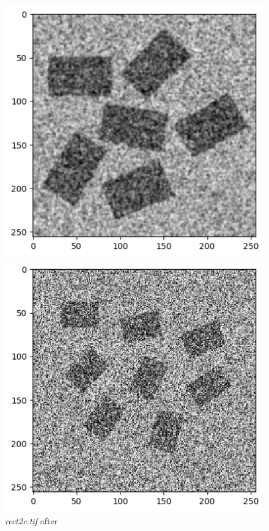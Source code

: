 \documentclass[runningheads]{llncs}
\begin{document}
\begin{figure}[h!]
\begin{minipage}[h]{0.47\linewidth}
\begin{center}
\includegraphics[width=1\linewidth]{Report/Result_Images/image_hc2.png} 
\caption{\emph{rect2c.tif} after}
\label{kc2-Kuwahara and Kernel 2}
\end{center}
\end{minipage}
\vfill
\vspace{0.2 cm}
\begin{minipage}[h]{0.47\linewidth}
\begin{center}
\includegraphics[width=1\linewidth]{Report/Result_Images/image_kc3.png} 

\end{center}
\end{minipage}
\end{figure}
\end{document}
